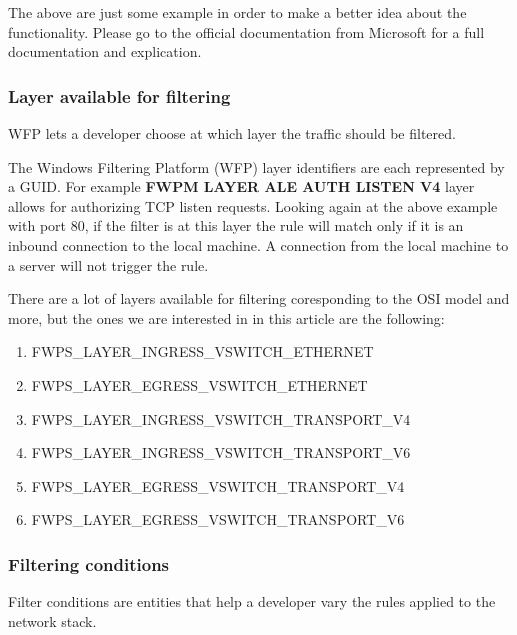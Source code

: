 The above are just some example in order to make a better idea about the functionality. Please go to the official documentation from Microsoft for a full documentation and explication.

\subsubsection{Layer available for filtering}

\vspace{5mm}

WFP lets a developer choose at which layer the traffic should be filtered.

\vspace{5mm}

The Windows Filtering Platform (WFP) layer identifiers are each represented by a GUID.
For example \textbf{FWPM LAYER ALE AUTH LISTEN V4} layer allows for authorizing TCP listen requests. Looking again at the above example with port 80, if the filter is at this layer the rule will match only if it is an inbound connection to the local machine. A connection from the local machine to a server will not trigger the rule. 

\vspace{5mm}

There are a lot of layers available for filtering coresponding to the OSI model and more, but the ones we are interested in in this article are the following: 

\vspace{5mm}

\begin{enumerate}
\item FWPS\_LAYER\_INGRESS\_VSWITCH\_ETHERNET
\item FWPS\_LAYER\_EGRESS\_VSWITCH\_ETHERNET
\item FWPS\_LAYER\_INGRESS\_VSWITCH\_TRANSPORT\_V4
\item FWPS\_LAYER\_INGRESS\_VSWITCH\_TRANSPORT\_V6
\item FWPS\_LAYER\_EGRESS\_VSWITCH\_TRANSPORT\_V4
\item FWPS\_LAYER\_EGRESS\_VSWITCH\_TRANSPORT\_V6
\end{enumerate}

\subsubsection{Filtering conditions}

Filter conditions are entities that help a developer vary the rules applied to the network stack.

